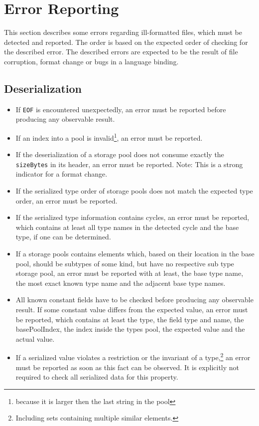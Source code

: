 \section{Error Reporting}

This section describes some errors regarding ill-formatted files, which must be detected and reported. The order is based on the expected order of checking for the described error. The described errors are expected to be the result of file corruption, format change or bugs in a language binding.

\subsection*{Deserialization}
\begin{itemize}
\item If \texttt{EOF} is encountered unexpectedly, an error must be reported before producing any observable result.

\item If an index into a pool is invalid\footnote{because it is larger then the last string in the pool}, an error must be reported.

\item If the deserialization of a storage pool does not consume exactly the \texttt{sizeBytes} in its header, an error must be reported. Note: This is a strong indicator for a format change.

\item If the serialized type order of storage pools does not match the expected type order, an error must be reported.

\item If the serialized type information contains cycles, an error must be reported, which contains at least all type names in the detected cycle and the base type, if one can be determined.

\item If a storage pools contains elements which, based on their location in the base pool, should be subtypes of some kind, but have no respective sub type storage pool, an error must be reported with at least, the base type name, the most exact known type name and the adjacent base type names.

\item All known constant fields have to be checked before producing any observable result. If some constant value differs from the expected value, an error must be reported, which contains at least the type, the field type and name, the basePoolIndex, the index inside the types pool, the expected value and the actual value.

\item If a serialized value violates a restriction or the invariant of a type,\footnote{Including sets containing multiple similar elements.} an error must be reported as soon as this fact can be observed. It is explicitly not required to check all serialized data for this property.
\end{itemize}



